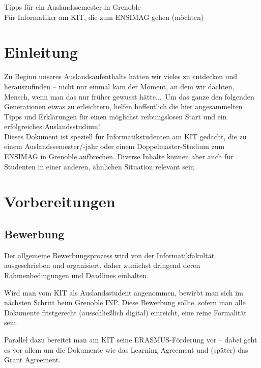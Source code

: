 \documentclass[11pt,a4paper]{article}
\begin{document}
	
	\begin{center}
	\huge Tipps für ein Auslandssemester in Grenoble\\
	\Large Für Informatiker am KIT, die zum ENSIMAG gehen (möchten)\\
	\vspace{1.5cm}
	\end{center}
			
	\tableofcontents
	
	\newpage
	\section{Einleitung}
	
	Zu Beginn unseres Auslandsaufenthalts hatten wir vieles zu entdecken und herauszufinden -- nicht nur einmal kam der Moment, an dem wir dachten, \glqq Mensch, wenn man das nur früher gewusst hätte...\grqq\ Um das ganze den folgenden Generationen etwas zu erleichtern, helfen hoffentlich die hier angesammelten Tipps und Erklärungen für einen möglichst reibungslosen Start und ein erfolgreiches Auslandsstudium!\\
	
	\noindent Dieses Dokument ist speziell für Informatikstudenten am KIT gedacht, die zu einem Auslandssemester/-jahr oder einem Doppelmaster-Studium zum ENSIMAG in Grenoble aufbrechen. Diverse Inhalte können aber auch für Studenten in einer anderen, ähnlichen Situation relevant sein.
		
	\newpage	
	\section{Vorbereitungen}
	
	\subsection{Bewerbung}
	
	Der allgemeine Bewerbungsprozess wird von der Informatikfakultät ausgeschrieben und organisiert, daher zunächst dringend deren Rahmenbedingungen und Deadlines einhalten. 
	
	Wird man vom KIT als Auslandsstudent angenommen, bewirbt man sich im nächsten Schritt beim Grenoble INP. Diese Bewerbung sollte, sofern man alle Dokumente fristgerecht (ausschließlich digital) einreicht, eine reine Formalität sein. 
	
	Parallel dazu bereitet man am KIT seine ERASMUS-Förderung vor -- dabei geht es vor allem um die Dokumente wie das Learning Agreement und (später) das Grant Agreement.
	
\end{document}
